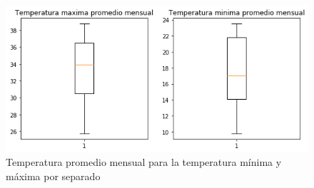 \documentclass[12pt]{article}
\begin{document}
\begin{figure}
    \centering
    \includegraphics[scale=.8]{act4.png}
    \caption{Temperatura promedio mensual para la temperatura mínima y máxima por separado}
    \label{fig:act4}
\end{figure}
\end{document}
